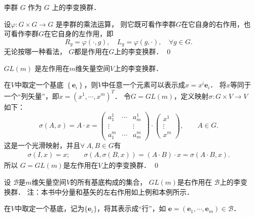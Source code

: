 \begin{example}
    李群 $G$ 作为 $G$ 上的李变换群．
\end{example}
设$\varphi: G \times G \rightarrow G$ 是李群的乘法运算，
则它既可看作李群$G$在它自身的右作用，也可看作李群$G$在它自身的左作用，即
\begin{equation}
    R_g=\varphi(\cdot, g), \quad L_g=\varphi(g, \cdot), \quad \forall g \in G .
\end{equation}
无论按哪一种看法， $G$都是作用在$G$上的李变换群．
\qed


\begin{example}\label{chlg:exm_GLonV}
    $ GL(m)$ 是左作用在$m$维矢量空间$V$上的李变换群．
\end{example}

在$V$中取定一个基底 $\left\{\boldsymbol{e}_i\right\}$，则$V$中任意一个元素可以表示成$x= x^i \boldsymbol{e}_i$．
将$x$等同于一个“列矢量”，即$x=\left(x^1, \cdots, x^m\right)^T$．
令$G=GL(m)$，定义映射$\sigma: G \times V \rightarrow V$ 如下：
\begin{equation*}
    \sigma(A, x)=A \cdot x=\left(\begin{array}{ccc}
        a_1^1 & \cdots & a_m^1 \\
        \vdots & & \vdots \\
        a_1^m & \cdots & a_m^m
    \end{array}\right) \cdot\left(\begin{array}{c}
        x^1 \\
        \vdots \\
        x^m
    \end{array}\right) ,\qquad A\in G.
\end{equation*}
这是一个光滑映射，并且$\forall \ A, B \in G$有
\begin{align*}
    \sigma(I, x)=x; \qquad
    \sigma(A, \sigma(B, x))=(A \cdot B) \cdot x=\sigma(A \cdot B, x).
\end{align*}
所以 $G=GL(m)$是左作用在$V$上的李变换群．
\qed

\begin{example}\label{chlg:exm_GLonB}
    设 $\mathscr{B}$是$m$维矢量空间$V$的所有基底构成的集合，
    $GL(m)$是右作用在 $\mathscr{B}$上的李变换群．
    注：本书中分量和基矢的左右作用如上例和本例所示．
\end{example}

在$V$中取定一个基底，记为$\{\boldsymbol{e}_i\}$，将其表示成“行”，如
$\boldsymbol{e}=\left(\boldsymbol{e}_1, \cdots, \boldsymbol{e}_m\right) \in \mathscr{B}$．

